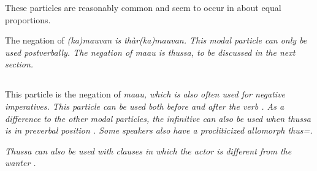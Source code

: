 These particles are reasonably common and seem to occur in about equal proportions.


The negation of \em (ka)mauvan \em is \em thàr(ka)mauvan\em. This modal particle can only be used postverbally. The negation of \em maau \em is \em thussa\em, to be discussed in the next section.

%
%


\subsection{}\label{sec:wc:thussa}
This particle is the negation of \em maau\em, which is also often used for negative imperatives. This particle can be used  both before   and after the verb . As a difference to the other modal particles, the infinitive can also be used when \em thussa \em is in preverbal position . Some speakers also have a procliticized allomorph \em thus=\em.




%



\em Thussa \em can also be used with clauses in which the actor is different from the wanter .


